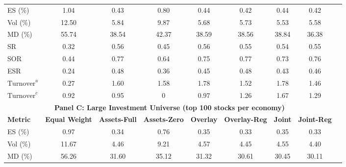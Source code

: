 \begin{table}
{\begin{tabular}{lcccccccc}
    \midrule
    ES (\%)                   & 1.04                    & 0.43                & 0.80              & 0.44              & 0.42             & 0.44                & 0.42    \\
    Vol (\%)                  & 12.50                   & 5.84                & 9.87              & 5.68              & 5.73             & 5.53                & 5.58    \\
    MD (\%)                   & 55.74                   & 38.54               & 42.37             & 38.59             & 38.56            & 38.84               & 36.38   \\
    SR                        & 0.32                    & 0.56                & 0.45              & 0.56              & 0.55             & 0.54                & 0.55    \\
    SOR                       & 0.44                    & 0.77                & 0.64              & 0.75              & 0.77             & 0.73                & 0.76    \\
    ESR                       & 0.24                    & 0.48                & 0.36              & 0.45              & 0.48             & 0.43                & 0.46    \\
    $\text{Turnover}^a$       & 0.27                    & 1.60                & 1.58              & 1.78              & 1.52             & 1.78                & 1.46    \\
    $\text{Turnover}^c$       & 0.92                    & 0.95                & 0                 & 0.97              & 1.26             & 1.67                & 1.29    \\
    \midrule
    \multicolumn{8}{c}{\textbf{Panel C: Large Investment Universe (top 100 stocks per economy)}} \\
    \midrule
    \textbf{Metric} & \textbf{Equal Weight} & \textbf{Assets-Full} & \textbf{Assets-Zero} & \textbf{Overlay} & \textbf{Overlay-Reg} & \textbf{Joint} & \textbf{Joint-Reg}\\
    \midrule
    ES (\%)                   & 0.97                    & 0.34                  & 0.76            & 0.35              & 0.33             & 0.35                & 0.33 \\
    Vol (\%)                  & 11.67                   & 4.46                  & 9.21            & 4.57              & 4.45             & 4.55                & 4.40\\
    MD (\%)                   & 56.26                   & 31.60                 & 35.12           & 31.32             & 30.61            & 30.45               & 30.11\\

\end{tabular}}
\end{table}
